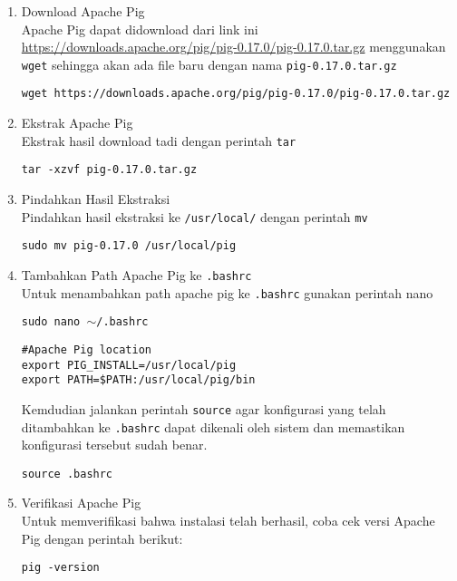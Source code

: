 \documentclass[a4paper]{tufte-handout}
\begin{document}
\begin{enumerate}
\item Download Apache Pig  \\
Apache Pig dapat didownload dari link ini \url{https://downloads.apache.org/pig/pig-0.17.0/pig-0.17.0.tar.gz} menggunakan {\tt wget} sehingga akan ada file baru dengan nama {\tt pig-0.17.0.tar.gz}

{\tt \small{wget https://downloads.apache.org/pig/pig-0.17.0/pig-0.17.0.tar.gz}}

\item Ekstrak Apache Pig \\
Ekstrak hasil download tadi dengan perintah {\tt tar}

{\tt tar -xzvf pig-0.17.0.tar.gz}

\item Pindahkan Hasil Ekstraksi \\
Pindahkan hasil ekstraksi ke {\tt /usr/local/} dengan perintah {\tt mv}

{\tt sudo mv pig-0.17.0 /usr/local/pig}

\item Tambahkan Path Apache Pig ke {\tt .bashrc} \\
Untuk menambahkan path apache pig ke {\tt .bashrc} gunakan perintah nano

{\tt sudo nano $\sim$/.bashrc}

\begin{lstlisting}
#Apache Pig location
export PIG_INSTALL=/usr/local/pig
export PATH=$PATH:/usr/local/pig/bin
\end{lstlisting}

Kemdudian jalankan perintah {\tt source} agar konfigurasi yang telah ditambahkan ke {\tt .bashrc} dapat dikenali oleh sistem dan memastikan konfigurasi tersebut sudah benar.

{\tt source .bashrc}

\item Verifikasi Apache Pig \\
Untuk memverifikasi bahwa instalasi telah berhasil, coba cek versi Apache Pig dengan perintah berikut:

{\tt pig -version}
\end{enumerate}
\end{document}
